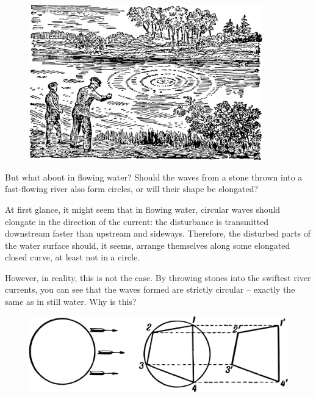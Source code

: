 \begin{figure}[h!]
\centering
\includegraphics[width=0.9\textwidth]{figures/ch-02/fig-046.pdf}
\end{figure}


But what about in flowing water? Should the waves from a stone thrown into a fast-flowing river also form circles, or will their shape be elongated?

At first glance, it might seem that in flowing water, circular waves should elongate in the direction of the current: the disturbance is transmitted downstream faster than upstream and sideways. Therefore, the disturbed parts of the water surface should, it seems, arrange themselves along some elongated closed curve, at least not in a circle.

However, in reality, this is not the case. By throwing stones into the swiftest river currents, you can see that the waves formed are strictly circular -- exactly the same as in still water. Why is this?

\begin{figure}[h!]
\centering
\includegraphics[width=\textwidth]{figures/ch-02/fig-047.pdf}
\end{figure}

